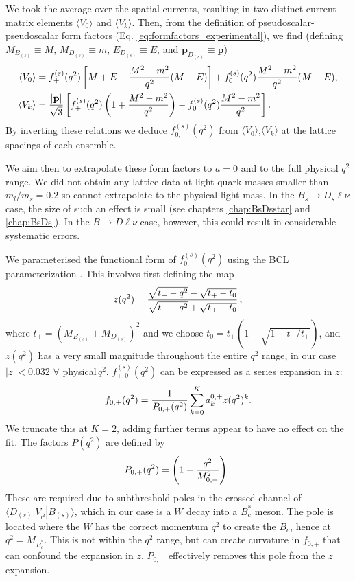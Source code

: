 We took the average over the spatial currents, resulting in two distinct current matrix elements $\langle V_0 \rangle$ and $\langle V_k \rangle$. Then, from the definition of pseudoscalar-pseudoscalar form factors (Eq. \eqref{eq:formfactors_experimental}), we find (defining $M_{B_{(s)}}\equiv M$, $M_{D_{(s)}}\equiv m$, $E_{D_{(s)}}\equiv E$, and ${\textbf{p}}_{D_{(s)}} \equiv {\textbf{p}}$)
\begin{align}
  \langle V_0 \rangle &= f^{(s)}_+(q^2) \left[ M + E - {M^2-m^2\over q^2}(M-E) \right] + f^{(s)}_0(q^2) {M^2-m^2\over q^2}(M-E), \\
  \langle V_k \rangle &= {|{\textbf{p}}|\over \sqrt{3}} \left[ f^{(s)}_+(q^2) \left( 1 + {M^2-m^2\over q^2} \right) - f^{(s)}_0(q^2) {M^2-m^2\over q^2} \right].
\end{align}
By inverting these relations we deduce $f^{(s)}_{0,+}(q^2)$ from $\langle V_0 \rangle$,$\langle V_k \rangle$ at the lattice spacings of each ensemble.

We aim then to extrapolate these form factors to $a=0$ and to the full physical $q^2$ range. We did not obtain any lattice data at light quark masses smaller than $m_l/m_s=0.2$ so cannot extrapolate to the physical light mass. In the $B_s\to D_s\ell\nu$ case, the size of such an effect is small (see chapters \ref{chap:BsDsstar} and \ref{chap:BsDs}). In the $B\to D\ell\nu$ case, however, this could result in considerable systematic errors.

We parameterised the functional form of $f^{(s)}_{0,+}(q^2)$ using the BCL parameterization \cite{PhysRevD.79.013008}. This involves first defining the map
\begin{align}
	z(q^2) = {\sqrt{t_+ - q^2} - \sqrt{t_+ - t_0} \over \sqrt{t_+ - q^2} + \sqrt{t_+ - t_0} }\,,
\end{align}
where $t_{\pm} = (M_{B_{(s)}} \pm M_{D_{(s)}})^2$ and we choose $t_0 = t_+( 1 - \sqrt{1 - t_-/t_+})$, and $z(q^2)$ has a very small magnitude throughout the entire $q^2$ range, in our case $|z| < 0.032 \,\,\forall \,\,$physical$\,q^2$. %
$f^{(s)}_{+,0}(q^2)$ can be expressed as a series expansion in $z$:
\begin{align}
	f_{0,+}(q^2) = {1\over P_{0,+}(q^2)} \sum^K_{k=0} a^{0,+}_k z(q^2)^k.
	\label{eq:zexpansion}
\end{align}
We truncate this at $K=2$, adding further terms appear to have no effect on the fit. The factors $P(q^2)$ are defined by
\begin{align}
	P_{0,+}(q^2) = \left( 1 - {q^2\over M_{0,+}^2}\right).
\end{align}
These are required due to subthreshold poles in the crossed channel of $\langle D_{(s)} | V_{\mu} | B_{(s)} \rangle$, which in our case is a $W$ decay into a $B^*_c$ meson. The pole is located where the $W$ has the correct momentum $q^2$ to create the $B_c$, hence at $q^2=M_{B^*_c}$. This is not within the $q^2$ range, but can create curvature in $f_{0,+}$ that can confound the expansion in $z$. $P_{0,+}$ effectively removes this pole from the $z$ expansion.

